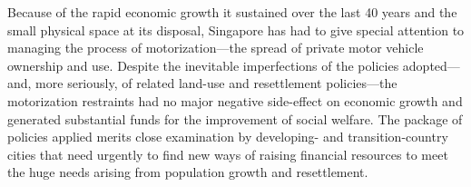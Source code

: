 Because of the rapid economic growth it sustained over the last 40 years and the small physical space at its disposal, Singapore has had to give special attention to managing the process of motorization—the spread of private motor vehicle ownership and use. Despite the inevitable imperfections of the policies adopted—and, more seriously, of related land-use and resettlement policies—the motorization restraints had no major negative side-effect on economic growth and generated substantial funds for the improvement of social welfare. The package of policies applied merits close examination by developing- and transition-country cities that need urgently to find new ways of raising financial resources to meet the huge needs arising from population growth and resettlement.
